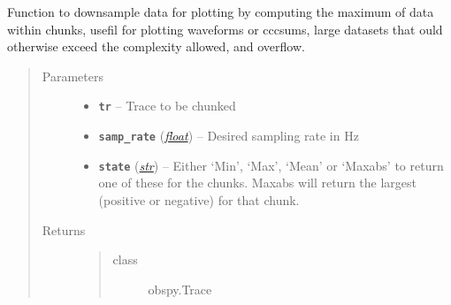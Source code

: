\documentclass[a4paper,10pt,english]{sphinxmanual}
\begin{document}
\begin{fulllineitems}
\label{submodules/utils.EQcorrscan_plotting:EQcorrscan_plotting.chunk_data}
Function to downsample data for plotting by computing the maximum of
data within chunks, usefil for plotting waveforms or cccsums, large datasets
that ould otherwise exceed the complexity allowed, and overflow.
\begin{quote}\begin{description}
\item[{Parameters}] \leavevmode\begin{itemize}
\item {} 
\textbf{\texttt{tr}} -- Trace to be chunked

\item {} 
\textbf{\texttt{samp\_rate}} (\href{https://docs.python.org/library/functions.html\#float}{\emph{float}}) -- Desired sampling rate in Hz

\item {} 
\textbf{\texttt{state}} (\href{https://docs.python.org/library/functions.html\#str}{\emph{str}}) -- Either `Min', `Max', `Mean' or `Maxabs' to return one of            these for the chunks. Maxabs will return the largest (positive or            negative) for that chunk.

\end{itemize}

\item[{Returns}] \leavevmode
\begin{quote}\begin{description}
\item[{class}] \leavevmode
obspy.Trace

\end{description}\end{quote}


\end{description}\end{quote}

\end{fulllineitems}

\end{document}
